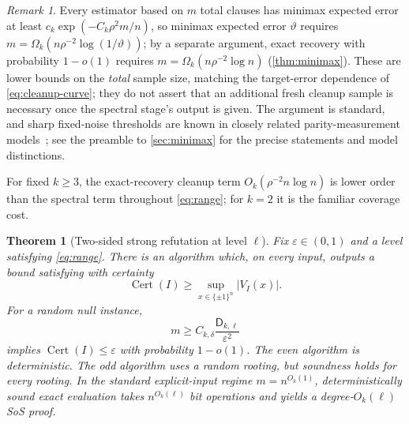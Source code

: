 \documentclass[11pt]{article}
\newtheorem{theorem}{Theorem}[section]
\theoremstyle{definition}
\theoremstyle{remark}
\newtheorem{remark}[remark]{Remark}
\newcommand{\1}{\mathbf 1}
\newcommand{\eps}{\varepsilon}
\newcommand{\Dkl}{\mathsf D_{k,\ell}}
\DeclareMathOperator{\Cert}{Cert}
\numberwithin{equation}{section}
\begin{document}
\begin{remark}
\label{rem:cleanup-converse}
Every estimator based on $m$ total clauses has minimax expected error
at least $c_k\exp(-C_k\rho^2m/n)$, so minimax expected error $\vartheta$
requires $m=\Omega_k(n\rho^{-2}\log(1/\vartheta))$; by a separate
argument, exact recovery with probability $1-o(1)$ requires
$m=\Omega_k(n\rho^{-2}\log n)$ (\cref{thm:minimax}).  These are lower
bounds on the \emph{total} sample size, matching the target-error
dependence of \cref{eq:cleanup-curve}; they do not assert that an
additional fresh cleanup sample is necessary once the spectral stage's
output is given.  The argument is standard, and sharp fixed-noise
thresholds are known in closely related parity-measurement
models~\cite{HWX,ALS}; see the preamble to \cref{sec:minimax} for
the precise statements and model distinctions.  
\end{remark}

For fixed $k\ge3$, the exact-recovery cleanup term
$O_k(\rho^{-2}n\log n)$ is lower order than the spectral term throughout
\cref{eq:range}; for $k=2$ it is the familiar coverage cost.

\begin{theorem}[Two-sided strong refutation at level $\ell$]
\label{thm:main-refutation}
Fix $\eps\in(0,1)$ and a level satisfying \cref{eq:range}.  There is an
algorithm which, on every input,
outputs a bound satisfying with certainty
\[
 \Cert(I)\ge\sup_{x\in\{\pm1\}^n}|V_I(x)|.
\]
For a random null instance,
\begin{equation}\label{eq:refutation-threshold}
 m\ge C_{k,\delta}\frac{\Dkl}{\eps^2}
\end{equation}
implies $\Cert(I)\le\eps$ with probability $1-o(1)$.  The even
algorithm is deterministic.  The odd algorithm uses a random rooting, but
soundness holds for every rooting.  In the standard explicit-input regime
$m=n^{O_k(1)}$, deterministically sound exact evaluation takes
$n^{O_k(\ell)}$ bit
operations and yields a degree-$O_k(\ell)$ SoS proof.  %
\end{theorem}
\end{document}
